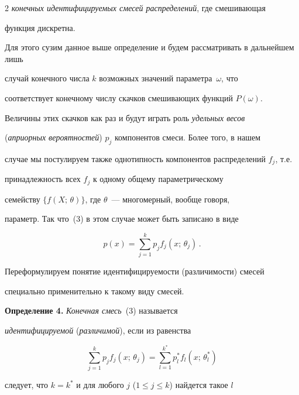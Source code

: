 \begin{multicols}{2}
\textit{конечных идентифицируемых смесей распределений}, где смешивающая


функция дискретна.





Для этого сузим данное выше определение и будем рассматривать в дальнейшем лишь 


случай конечного числа $k$ возможных значений па\-ра\-мет\-ра~$\omega$, что 


соответствует конечному числу скачков смешивающих функций $P(\omega )$.  


Величины этих скачков как раз и будут играть роль \textit{удельных весов} 


(\textit{априорных вероятностей}) $p_j$ компонентов смеси. Более того, в нашем 


случае мы постулируем также однотипность компонентов распределений $f_j$, т.е.\ 


принадлежность всех $f_j$ к одному общему па\-ра\-мет\-ри\-че\-ско\-му 


семейству $\{ f(X;\,\theta )\}$, где $\theta$~--- многомерный, вообще говоря, 


параметр. Так что~(3) в этом случае может быть записано в виде


\begin{equation} %


p(x) = \sum\limits^k_{j=1} p_j f_j (x;\,\theta_j )\,.


\end{equation}





Переформулируем понятие идентифицируемости (различимости) смесей


специально применительно к такому виду смесей.





\medskip


\textbf{Определение 4.} \textit{Конечная смесь}~(3) называется


\textit{идентифицируемой} (\textit{различимой}), если из равенства


$$


\sum\limits_{j=1}^k p_j f_j (x;\,\theta_j ) = \sum\limits_{l=1}^{k^*} p_l^* f_l


(x;\,\theta_l^* )


$$


следует, что $k=k^*$ и для любого $j$ ($1\leq j \leq k$) найдется такое $l$ 



\end{multicols}
